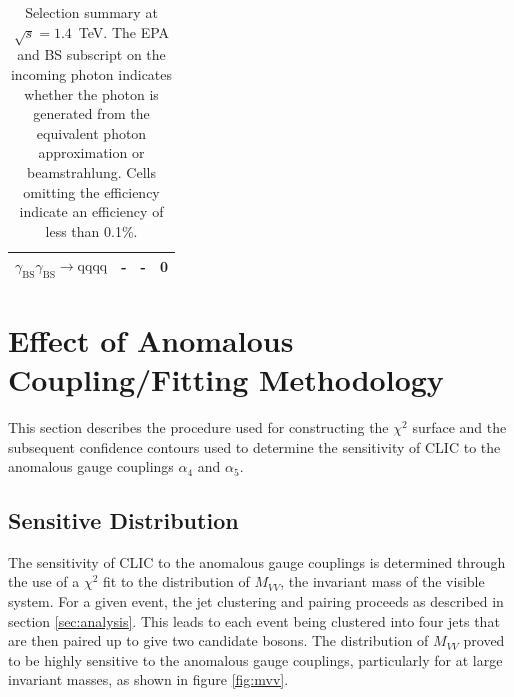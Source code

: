 \begin{table}[h!]
\begin{tabular}{ l r r r }
$\gamma_{\text{BS}}\gamma_{\text{BS}} \rightarrow \text{qqqq}$ & - & - & 0 \\
\hline
\end{tabular}
\caption[Selection summary at $\sqrt{s}=1.4$~TeV.   The EPA and BS subscript on the incoming photon indicates whether the photon is generated from the equivalent photon approximation or beamstrahlung.  Cells omitting the efficiency indicate an efficiency of less than 0.1\%.]{Selection summary at $\sqrt{s}=1.4$~TeV.   The EPA and BS subscript on the incoming photon indicates whether the photon is generated from the equivalent photon approximation or beamstrahlung.  Cells omitting the efficiency indicate an efficiency of less than 0.1\%.}
\label{table:selectionsummary1400GeV}
\end{table}


\section{Effect of Anomalous Coupling/Fitting Methodology}
\label{sec:fitting}
This section describes the procedure used for constructing the $\chi^{2}$ surface and the subsequent confidence contours used to determine the sensitivity of CLIC to the anomalous gauge couplings $\alpha_{4}$ and $\alpha_{5}$.


\subsection{Sensitive Distribution}
The sensitivity of CLIC to the anomalous gauge couplings is determined through the use of a $\chi^{2}$ fit to the distribution of $M_{VV}$, the invariant mass of the visible system.  For a given event, the jet clustering and pairing proceeds as described in section \ref{sec:analysis}.  This leads to each event being clustered into four jets that are then paired up to give two candidate bosons.  The distribution of $M_{VV}$ proved to be highly sensitive to the anomalous gauge couplings, particularly for at large invariant masses, as shown in figure \ref{fig:mvv}.

